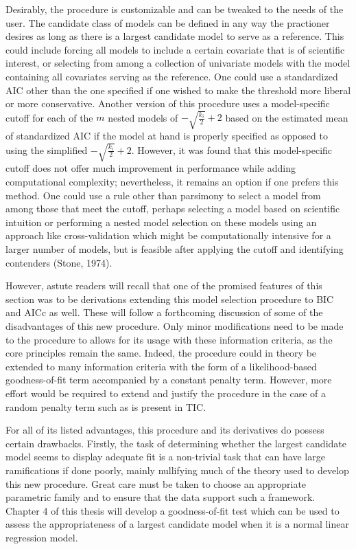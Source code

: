 		Desirably, the procedure is customizable and can be tweaked to the needs of the user. The candidate class of models can be defined in any way the practioner desires
		as long as there is a largest candidate model to serve as a reference. This could include forcing all models to include a certain covariate that is of scientific
		interest, or selecting from among a collection of univariate models with the model containing all covariates serving as the reference. One could use a standardized
		AIC other than the one specified if one wished to make the threshold more liberal or more conservative. Another version of this procedure uses a model-specific
		cutoff for each of the $m$ nested models of $-\sqrt{\frac{k_i}{2}} + 2$ based on the estimated mean of standardized AIC if the model at hand is properly specified
		as opposed to using the simplified $-\sqrt{\frac{k_i}{2}} + 2$. However, it was found that this model-specific cutoff does not offer much improvement in performance
		while adding computational complexity; nevertheless, it remains an option if one prefers this method. One could use a rule other than parsimony to select a model
		from among those that meet the cutoff, perhaps selecting a model based on scientific intuition or performing a nested model selection on these models using
		an approach like cross-validation which might be computationally intensive for a larger number of models, but is feasible after applying the cutoff and
		identifying contenders (Stone, 1974).

		However, astute readers will recall that one of the promised features of this section was to be derivations extending this model selection procedure to BIC and
		AICc as well. These will follow a forthcoming discussion of some of the disadvantages of this new procedure. Only minor modifications need to be made to the
		procedure to allows for its usage with these information criteria, as the core principles remain the same. Indeed, the procedure could in theory be extended to
		many information criteria with the form of a likelihood-based goodness-of-fit term accompanied by a constant penalty term. However, more effort would be required
		to extend and justify the procedure in the case of a random penalty term such as is present in TIC.

		For all of its listed advantages, this procedure and its derivatives do possess certain drawbacks. Firstly, the task of determining whether the largest candidate
		model seems to display adequate fit is a non-trivial task that can have large ramifications if done poorly, mainly nullifying much of the theory used to develop this
		new procedure. Great care must be taken to choose an appropriate parametric family and to ensure that the data support such a framework. Chapter 4 of this thesis will
		develop a goodness-of-fit test which can be used to assess the appropriateness of a largest candidate model when it is a normal linear regression model.

